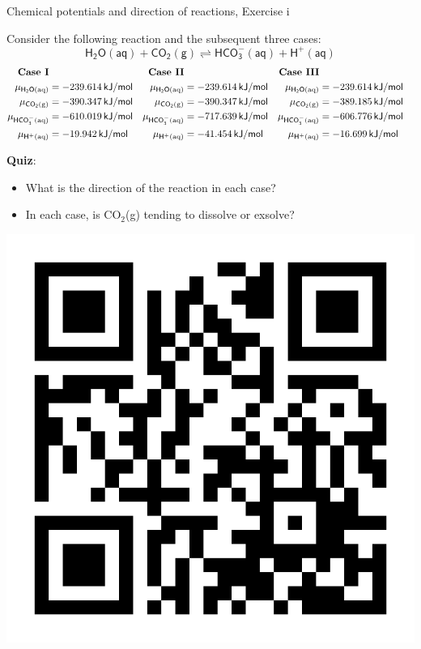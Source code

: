 \begin{frame}{Chemical potentials and direction of reactions, Exercise \; i}

Consider the following reaction and the subsequent
three cases:{
\[
\mathsf{H_{2}O(aq)+CO_{2}(g)\rightleftharpoons HCO_{3}^{-}(aq)+H^{+}(aq)}
\]
}\vspace{-4ex}
{\small{}
\begin{align*}
\text{\textbf{Case I}} &  & \textbf{Case II} &  & \textbf{Case III}\\
\mu_{\mathsf{H_{2}O\text{(aq)}}} & = -239.614\,{\mathsf{kJ/mol}} & 
\mu_{\mathsf{H_{2}O\text{(aq)}}} & = -239.614\,{\mathsf{kJ/mol}} & 
\mu_{\mathsf{H_{2}O\text{(aq)}}} & = -239.614\,{\mathsf{kJ/mol}}\\
\mu_{\mathsf{CO_{2}\text{(g)}}} & = -390.347\,{\mathsf{kJ/mol}} & 
\mu_{\mathsf{CO_{2}\text{(g)}}} & = -390.347\,{\mathsf{kJ/mol}} & 
\mu_{\mathsf{CO_{2}\text{(g)}}} & = -389.185\,{\mathsf{kJ/mol}}\\
\mu_{\mathsf{HCO_{3}^{-}\text{(aq)}}} & = -610.019\,{\mathsf{kJ/mol}} & 
\mu_{\mathsf{HCO_{3}^{-}\text{(aq)}}} & = -717.639\,{\mathsf{kJ/mol}} & 
\mu_{\mathsf{HCO_{3}^{-}\text{(aq)}}} & = -606.776\,{\mathsf{kJ/mol}}\\
\mu_{\mathsf{H^{+}\text{(aq)}}} & = -19.942\,{\mathsf{kJ/mol}} & 
\mu_{\mathsf{H^{+}\text{(aq)}}} & = -41.454\,{\mathsf{kJ/mol}} & 
\mu_{\mathsf{H^{+}\text{(aq)}}} & = -16.699\,{\mathsf{kJ/mol}}
\end{align*}
}{\small\par}
\pause
\alert{\textbf{Quiz}}:
\begin{itemize}
\item What is the direction of the reaction in each case?
\item In each case, is CO$_{2}$(g) tending to dissolve or exsolve? 
\end{itemize}
\vskip -45pt
\includegraphics[height=0.16\columnwidth,right]{figures/chemical-equilibrium/poll.png}
\end{frame}
%
